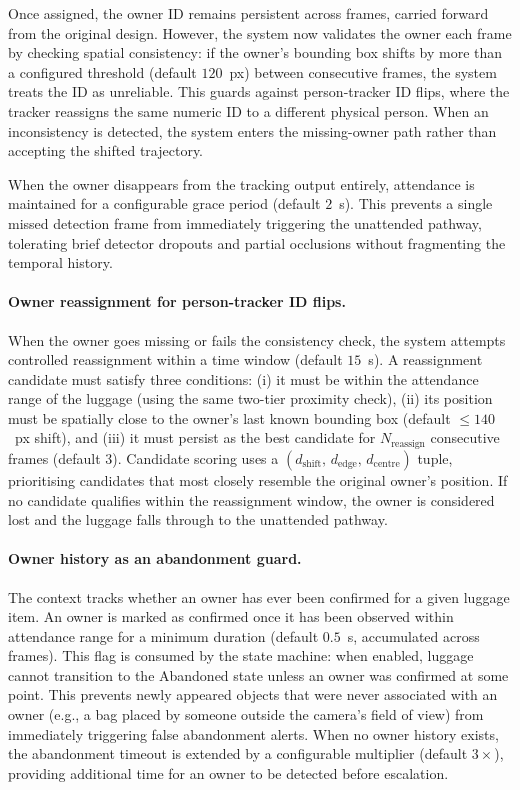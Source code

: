 Once assigned, the owner ID remains persistent across frames, carried forward
from the original design. However, the system now validates the owner each
frame by checking spatial consistency: if the owner's bounding box shifts by
more than a configured threshold (default $120$~px) between consecutive frames,
the system treats the ID as unreliable. This guards against person-tracker ID
flips, where the tracker reassigns the same numeric ID to a different physical
person. When an inconsistency is detected, the system enters the missing-owner
path rather than accepting the shifted trajectory.

When the owner disappears from the tracking output entirely, attendance is
maintained for a configurable grace period (default $2$~s). This prevents a
single missed detection frame from immediately triggering the unattended
pathway, tolerating brief detector dropouts and partial occlusions without
fragmenting the temporal history.

\paragraph{Owner reassignment for person-tracker ID flips.}

When the owner goes missing or fails the consistency check, the system attempts
controlled reassignment within a time window (default $15$~s). A reassignment
candidate must satisfy three conditions: (i) it must be within the attendance
range of the luggage (using the same two-tier proximity check), (ii) its
position must be spatially close to the owner's last known bounding box
(default $\leq 140$~px shift), and (iii) it must persist as the best candidate
for $N_{\text{reassign}}$ consecutive frames (default $3$). Candidate scoring
uses a $(d_{\text{shift}},\, d_{\text{edge}},\, d_{\text{centre}})$ tuple,
prioritising candidates that most closely resemble the original owner's
position. If no candidate qualifies within the reassignment window, the owner
is considered lost and the luggage falls through to the unattended pathway.

\paragraph{Owner history as an abandonment guard.}

The context tracks whether an owner has ever been confirmed for a given luggage
item. An owner is marked as confirmed once it has been observed within
attendance range for a minimum duration (default $0.5$~s, accumulated across
frames). This flag is consumed by the state machine: when enabled, luggage
cannot transition to the Abandoned state unless an owner was confirmed at some
point. This prevents newly appeared objects that were never associated with an
owner (e.g., a bag placed by someone outside the camera's field of view) from
immediately triggering false abandonment alerts. When no owner history exists,
the abandonment timeout is extended by a configurable multiplier (default
$3\times$), providing additional time for an owner to be detected before
escalation.

